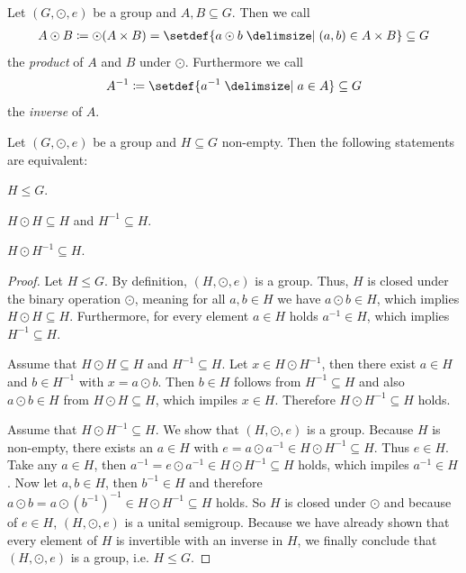\begin{definition}
    Let $(G,\odot,e)$ be a group and $A,B\subseteq G$. Then we call
    \begin{align}A\odot B\coloneq \odot(A\times B)=\setdef{a\odot b\given (a,b)\in A\times B}\subseteq G\end{align}
    the \emph{product} of $A$ and $B$ under $\odot$. Furthermore we call
    \begin{align}A^{-1}\coloneq \setdef{a^{-1}\given a\in A}\subseteq G\end{align}
    the \emph{inverse} of $A$.
\end{definition}

\begin{theorem}\label{theorem:groups:subgroups_characterization}
    Let $(G,\odot,e)$ be a group and $H\subseteq G$ non-empty. Then the following statements are equivalent:
    \begin{intheoremenumerate}
        \item $H\leq G$.
        \item $H\odot H\subseteq H$ and $H^{-1}\subseteq H$.
        \item $H\odot H^{-1}\subseteq H$.
    \end{intheoremenumerate}
\end{theorem}

\begin{proof}
     Let $H\leq G$. By definition, $(H,\odot,e)$ is a group. Thus, $H$ is closed under the binary operation $\odot$, meaning for all $a,b\in H$ we have $a\odot b \in H$, which implies $H\odot H \subseteq H$. Furthermore, for every element $a\in H$ holds $a^{-1}\in H$, which implies $H^{-1} \subseteq H$.
    
     Assume that $H\odot H\subseteq H$ and $H^{-1}\subseteq H$. Let $x\in H\odot H^{-1}$, then there exist $a\in H$ and $b\in H^{-1}$ with $x=a\odot b$. Then $b\in H$ follows from $H^{-1}\subseteq H$ and also $a\odot b\in H$ from $H\odot H\subseteq H$, which impiles $x\in H$. Therefore $H\odot H^{-1}\subseteq H$ holds.
    
     Assume that $H\odot H^{-1}\subseteq H$. We show that $(H,\odot,e)$ is a group. Because $H$ is non-empty, there exists an $a\in H$ with $e=a\odot a^{-1}\in H\odot H^{-1}\subseteq H$. Thus $e\in H$. Take any $a\in H$, then $a^{-1}=e\odot a^{-1}\in H\odot H^{-1}\subseteq H$ holds, which impiles $a^{-1}\in H$. Now let $a,b\in H$, then $b^{-1}\in H$ and therefore $a\odot b=a\odot (b^{-1})^{-1}\in H\odot H^{-1}\subseteq H$ holds. So $H$ is closed under $\odot$ and because of $e\in H$, $(H,\odot,e)$ is a unital semigroup. Because we have already shown that every element of $H$ is invertible with an inverse in $H$, we finally conclude that $(H,\odot,e)$ is a group, i.e. $H\leq G$.
\end{proof}

